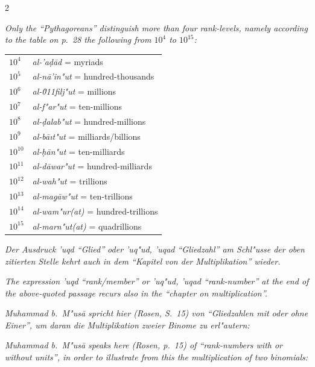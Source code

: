 \documentclass[10pt,a4paper]{article}
\newcommand{\enquote}[1]{``#1''}
\begin{document}
\begin{paracol}{2}
\switchcolumn

\textit{Only the \enquote{Pythagoreans} distinguish more than four rank-levels, namely according to the table on p.\ 28 the following from $10^{4}$ to $10^{15}$:}

\begin{center}
\begin{tabular}{ll}
$10^{4}$ & \textit{al-'a\d{d}\=ad} = myriads \\
$10^{5}$ & \textit{al-n\=a'in"ut} = hundred-thousands \\
$10^{6}$ & \textit{al-\u011filj"ut} = millions \\
$10^{7}$ & \textit{al-f"ar"ut} = ten-millions \\
$10^{8}$ & \textit{al-\d{d}alab"ut} = hundred-millions \\
$10^{9}$ & \textit{al-b\=a\i{}t"ut} = milliards/billions \\
$10^{10}$ & \textit{al-\d{h}\=an"ut} = ten-milliards \\
$10^{11}$ & \textit{al-d\=awar"ut} = hundred-milliards \\
$10^{12}$ & \textit{al-wah"ut} = trillions \\
$10^{13}$ & \textit{al-ma\d{g}\=aw"ut} = ten-trillions \\
$10^{14}$ & \textit{al-wam"ur(at)} = hundred-trillions \\
$10^{15}$ & \textit{al-marn"ut(at)} = quadrillions
\end{tabular}
\end{center}

\switchcolumn*

\textit{Der Ausdruck \textit{'uqd} \enquote{Glied} oder \textit{'uq"ud, 'uqad} \enquote{Gliedzahl} am Schl"usse der oben zitierten Stelle kehrt auch in dem \enquote{Kapitel von der Multiplikation} wieder.}

\switchcolumn

\textit{The expression \textit{'uqd} \enquote{rank/member} or \textit{'uq"ud, 'uqad} \enquote{rank-number} at the end of the above-quoted passage recurs also in the \enquote{chapter on multiplication}.}

\switchcolumn*

\textit{Muhammad b.\ M"us\=a spricht hier (Rosen, S.\ 15) von \enquote{Gliedzahlen mit oder ohne Einer}, um daran die Multiplikation zweier Binome zu erl"autern:}

\switchcolumn

\textit{Muhammad b.\ M"us\=a speaks here (Rosen, p.\ 15) of \enquote{rank-numbers with or without units}, in order to illustrate from this the multiplication of two binomials:}


\end{paracol}
\end{document}

